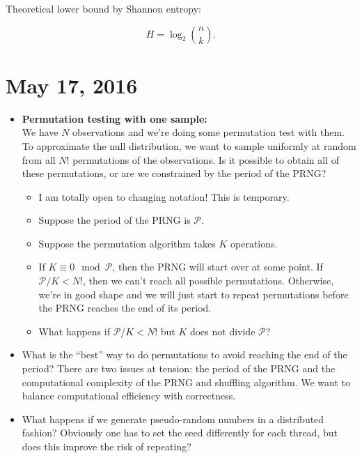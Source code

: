 \documentclass[12pt]{article}
\begin{document}
Theoretical lower bound by Shannon entropy:

$$ H = \log_2 {{n} \choose {k}}.$$


\section{May 17, 2016}
\begin{itemize}
\item \textbf{Permutation testing with one sample:} \\
We have $N$ observations and we're doing some permutation test with them.
To approximate the null distribution, we want to sample uniformly at random from all $N!$ permutations of the observations.
Is it possible to obtain all of these permutations, or are we constrained by the period of the PRNG?
\begin{itemize}
\item I am totally open to changing notation! This is temporary.
\item Suppose the period of the PRNG is $\mathcal{P}$.
\item Suppose the permutation algorithm takes $K$ operations.
\item If $K \equiv 0 \mod \mathcal{P}$, then the PRNG will start over at some point. If $\mathcal{P}/K < N!$, then we can't reach all possible permutations.
Otherwise, we're in good shape and we will just start to repeat permutations before the PRNG reaches the end of its period.
\item What happens if $\mathcal{P}/K < N!$ but $K$ does not divide $\mathcal{P}$?
\end{itemize}
\item What is the ``best'' way to do permutations to avoid reaching the end of the period?
There are two issues at tension: the period of the PRNG and the computational complexity of the PRNG and shuffling algorithm.
We want to balance computational efficiency with correctness.
\item What happens if we generate pseudo-random numbers in a distributed fashion?
Obviously one has to set the seed differently for each thread, but does this improve the risk of repeating?
\end{itemize}



\end{document}
